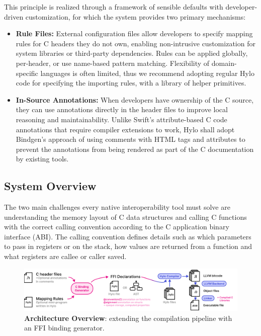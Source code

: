 This principle is realized through a framework of sensible defaults with developer-driven customization, for which the system provides two primary mechanisms:
\begin{itemize}
    \item \textbf{Rule Files:} External configuration files allow developers to specify mapping rules for C headers they do not own, enabling non-intrusive customization for system libraries or third-party dependencies. Rules can be applied globally, per-header, or use name-based pattern matching. Flexibility of domain-specific languages is often limited, thus we recommend adopting regular Hylo code for specifying the importing rules, with a library of helper primitives.
    \item \textbf{In-Source Annotations:} When developers have ownership of the C source, they can use annotations directly in the header files to improve local reasoning and maintainability. Unlike Swift's attribute-based C code annotations that require compiler extensions to work, Hylo shall adopt Bindgen's approach of using comments with HTML tags and attributes to prevent the annotations from being rendered as part of the C documentation by existing tools.
\end{itemize}

\subsection{System Overview}
The two main challenges every native interoperability tool must solve are understanding the memory layout of C data structures and calling C functions with the correct calling convention according to the C application binary interface (ABI). The calling convention defines details such as which parameters to pass in registers or on the stack, how values are returned from a function and what registers are callee or caller saved.

\begin{figure}[]
    \includegraphics[width=1\textwidth]{attachments/architecture-overview.pdf}
    \caption{\textbf{Architecture Overview}: extending the compilation pipeline with an FFI binding generator.}
    \label{fig:architecture}
\end{figure}


